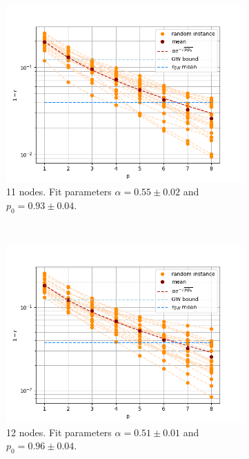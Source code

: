 \begin{figure}[H]
	\centering
	\begin{subfigure}[t]{0.45\textwidth}
		\centering
		\includegraphics[width=\textwidth]{figures/interp/fom_er050_n11}
		\caption{11 nodes. Fit parameters $\alpha = 0.55 \pm 0.02$ and $p_0 = 0.93 \pm 0.04$.}
	\end{subfigure}
	~
	\begin{subfigure}[t]{0.45\textwidth}
		\centering
		\includegraphics[width=\textwidth]{figures/interp/fom_er050_n12}
		\caption{12 nodes. Fit parameters $\alpha = 0.51 \pm 0.01$ and $p_0 = 0.96 \pm 0.04$.}
	\end{subfigure}
	\\
	\centering
	\begin{subfigure}[t]{0.45\textwidth}

\end{subfigure}
\end{figure}
